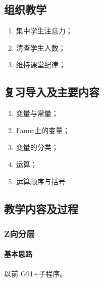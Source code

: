 \jxhj{%
	}
\skrq{%
	}

\makeshouye %

\subsection{组织教学}
\begin{enumerate}[\hspace{2em}1、]
	\item 集中学生注意力；
	\item 清查学生人数；
	\item 维持课堂纪律；
\end{enumerate}
\subsection{复习导入及主要内容}
\begin{enumerate}[\hspace{2em}1、]
\item 变量与常量；
\item Fanuc上的变量；
\item 变量的分类；
\item 运算；
\item 运算顺序与括号
\end{enumerate}
\subsection{教学内容及过程}
\subsubsection{Z向分层} 
\paragraph{基本思路} 
以前 G91+子程序。


